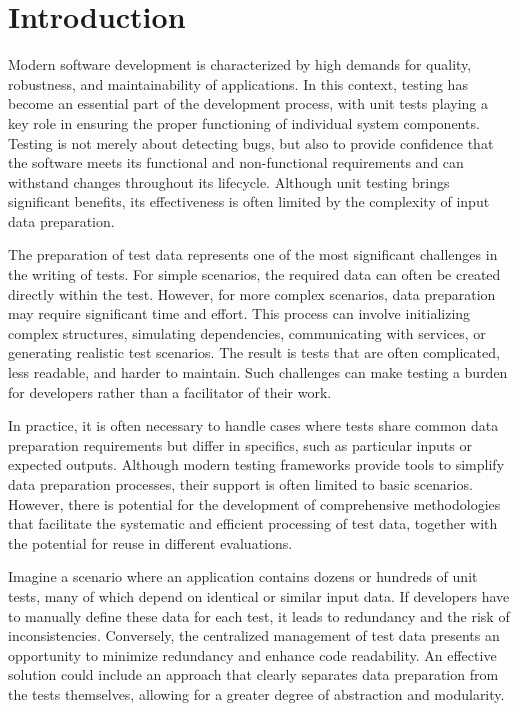 
\chapter{Introduction\label{chap:introduction}}

Modern software development is characterized by high demands for quality, robustness, and maintainability of applications. In this context, testing has become an essential part of the development process, with unit tests playing a key role in ensuring the proper functioning of individual system components. Testing is not merely about detecting bugs, but also to provide confidence that the software meets its functional and non-functional requirements and can withstand changes throughout its lifecycle. Although unit testing brings significant benefits, its effectiveness is often limited by the complexity of input data preparation.

The preparation of test data represents one of the most significant challenges in the writing of tests. For simple scenarios, the required data can often be created directly within the test. However, for more complex scenarios, data preparation may require significant time and effort. This process can involve initializing complex structures, simulating dependencies, communicating with services, or generating realistic test scenarios. The result is tests that are often complicated, less readable, and harder to maintain. Such challenges can make testing a burden for developers rather than a facilitator of their work.

In practice, it is often necessary to handle cases where tests share common data preparation requirements but differ in specifics, such as particular inputs or expected outputs. Although modern testing frameworks provide tools to simplify data preparation processes, their support is often limited to basic scenarios. However, there is potential for the development of comprehensive methodologies that facilitate the systematic and efficient processing of test data, together with the potential for reuse in different evaluations.

Imagine a scenario where an application contains dozens or hundreds of unit tests, many of which depend on identical or similar input data. If developers have to manually define these data for each test, it leads to redundancy and the risk of inconsistencies. Conversely, the centralized management of test data presents an opportunity to minimize redundancy and enhance code readability. An effective solution could include an approach that clearly separates data preparation from the tests themselves, allowing for a greater degree of abstraction and modularity.


